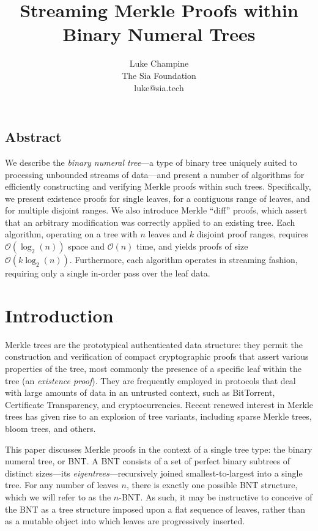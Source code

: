 \documentclass[twocolumn]{article}
\title{Streaming Merkle Proofs within Binary Numeral Trees}
\author{
Luke Champine\\
The Sia Foundation\\
luke@sia.tech
}
\begin{document}
\frenchspacing

\maketitle


\subsection*{Abstract}
We describe the \textit{binary numeral tree}---a type of binary tree uniquely suited to processing unbounded streams of data---and present a number of algorithms for efficiently constructing and verifying Merkle proofs within such trees. Specifically, we present existence proofs for single leaves, for a contiguous range of leaves, and for multiple disjoint ranges. We also introduce Merkle ``diff'' proofs, which assert that an arbitrary modification was correctly applied to an existing tree. Each algorithm, operating on a tree with $n$ leaves and $k$ disjoint proof ranges, requires $\mathcal{O}(\log_2(n))$ space and $\mathcal{O}(n)$ time, and yields proofs of size $\mathcal{O}(k\log_2 (n))$. Furthermore, each algorithm operates in streaming fashion, requiring only a single in-order pass over the leaf data.


\section{Introduction}

Merkle trees\cite{Merkle} are the prototypical authenticated data structure: they permit the construction and verification of compact cryptographic proofs that assert various properties of the tree, most commonly the presence of a specific leaf within the tree (an \textit{existence proof}). They are frequently employed in protocols that deal with large amounts of data in an untrusted context, such as BitTorrent, Certificate Transparency, and cryptocurrencies. Recent renewed interest in Merkle trees has given rise to an explosion of tree variants, including sparse Merkle trees, bloom trees, and others.

This paper discusses Merkle proofs in the context of a single tree type: the binary numeral tree, or BNT. A BNT consists of a set of perfect binary subtrees of distinct sizes---its \textit{eigentrees}---recursively joined smallest-to-largest into a single tree. For any number of leaves $n$, there is exactly one possible BNT structure, which we will refer to as the $n$-BNT. As such, it may be instructive to conceive of the BNT as a tree structure imposed upon a flat sequence of leaves, rather than as a mutable object into which leaves are progressively inserted.
\end{document}
